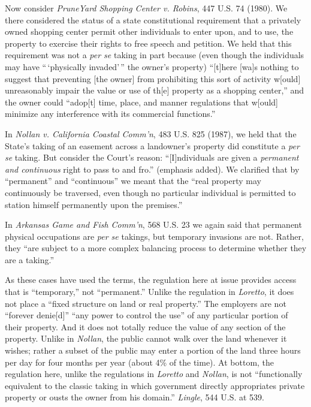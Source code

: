 Now consider \textit{PruneYard Shopping Center v. Robins}, 447 U.S. 74 (1980).
We there considered the status of a state constitutional requirement that a
privately owned shopping center permit other individuals to enter upon, and to
use, the property to exercise their rights to free speech and petition. We held
that this requirement was not a \textit{per se} taking in part because (even
though the individuals may have ``\,`physically invaded'\,'' the owner's
property) ``[t]here [wa]s nothing to suggest that preventing [the owner] from
prohibiting this sort of activity w[ould] unreasonably impair the value or use
of th[e] property as a shopping center,'' and the owner could ``adop[t] time,
place, and manner regulations that w[ould] minimize any interference with its
commercial functions.'' 


In \textit{Nollan v. California Coastal Comm'n}, 483 U.S. 825 (1987), we held
that the State's taking of an easement across a landowner's property did
constitute a \textit{per se} taking. But consider the Court's reason:
``[I]ndividuals are given a \textit{permanent and continuous} right to pass to
and fro.'' (emphasis added). We clarified that by ``permanent'' and
``continuous'' we meant that the ``real property may continuously be traversed,
even though no particular individual is permitted to station himself permanently
upon the premises.''


In \textit{Arkansas Game and Fish Comm'n}, 568 U.S. 23 we again said that
permanent physical occupations are \textit{per se} takings, but temporary
invasions are not. Rather, they ``are subject to a more complex balancing
process to determine whether they are a taking.'' 


As these cases have used the terms, the regulation here at issue provides access
that is ``temporary,'' not ``permanent.'' Unlike the regulation in
\textit{Loretto}, it does not place a ``fixed structure on land or real
property.'' The employers are not ``forever denie[d]'' ``any power to control
the use'' of any particular portion of their property. And it does not totally
reduce the value of any section of the property. Unlike in \textit{Nollan}, the
public cannot walk over the land whenever it wishes; rather a subset of the
public may enter a portion of the land three hours per day for four months per
year (about 4\% of the time). At bottom, the regulation here, unlike the
regulations in \textit{Loretto} and \textit{Nollan}, is not ``functionally
equivalent to the classic taking in which government directly appropriates
private property or ousts the owner from his domain.'' \textit{Lingle}, 544 U.S.
at 539.


